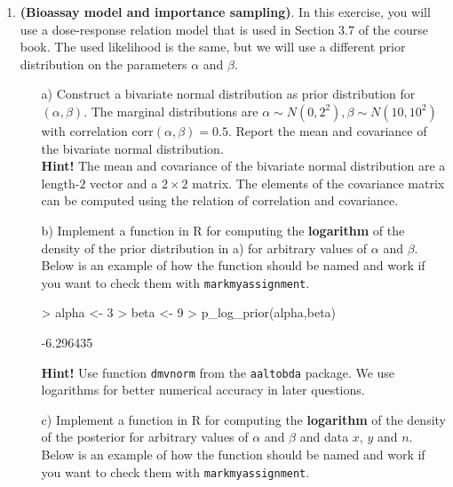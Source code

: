 \documentclass[11pt,a4paper,english]{article}
\begin{document}
\begin{enumerate}

\item {\bf (Bioassay model and importance sampling)}. In this exercise, you will use a dose-response relation model that is used in Section 3.7 of the course book. The used likelihood is the same, but
we will use a different prior distribution on the parameters $\alpha$ and $\beta$.


\begin{itemize}
    \item[a)] Construct a bivariate normal distribution as prior distribution for $(\alpha,\beta)$.
    The marginal distributions are $\alpha \sim N(0,2^2), \beta \sim N(10,10^2)$ with correlation $\mathrm{corr}(\alpha, \beta)=0.5$. Report the mean and covariance
    of the bivariate normal distribution.\\
\textbf{Hint!} The mean and covariance of the bivariate normal distribution are a length-$2$ vector and a $2 \times 2$ matrix. The elements of the covariance matrix can be computed using the relation of correlation and covariance.
  \item[b)] Implement a function in R for computing the \textbf{logarithm} of the density of the
  prior distribution in a) for arbitrary values of $\alpha$ and $\beta$. Below is an example of how the function should be named and work if you want to check them with \texttt{markmyassignment}. 
  
\begin{Schunk}
\begin{Sinput}
> alpha <- 3
> beta <- 9
> p_log_prior(alpha,beta)
\end{Sinput}
\begin{Soutput}
[1] -6.296435
\end{Soutput}
\end{Schunk}
 
\textbf{Hint!} Use function {\tt dmvnorm} from the {\tt aaltobda} package. We use logarithms for better numerical accuracy in later questions.

\item[c)] Implement a function in R for computing the \textbf{logarithm} of the density of the posterior for arbitrary values of $\alpha$ and $\beta$ and data $x$, $y$ and $n$. Below is an example of how the function should be named and work if you want to check them with \texttt{markmyassignment}. 
 

\end{itemize}
\end{enumerate}
\end{document}
